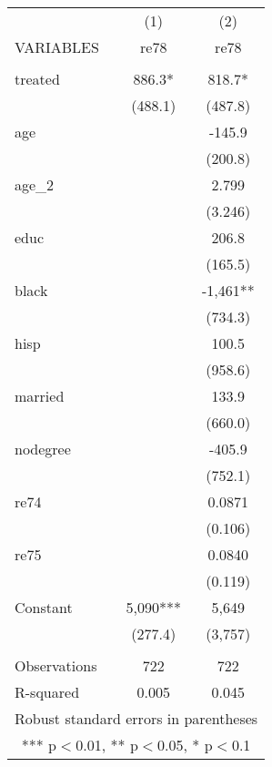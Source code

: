 \begin{tabular}{lcc} \hline
 & (1) & (2) \\
VARIABLES & re78 & re78 \\ \hline
 &  &  \\
treated & 886.3* & 818.7* \\
 & (488.1) & (487.8) \\
age &  & -145.9 \\
 &  & (200.8) \\
age\_2 &  & 2.799 \\
 &  & (3.246) \\
educ &  & 206.8 \\
 &  & (165.5) \\
black &  & -1,461** \\
 &  & (734.3) \\
hisp &  & 100.5 \\
 &  & (958.6) \\
married &  & 133.9 \\
 &  & (660.0) \\
nodegree &  & -405.9 \\
 &  & (752.1) \\
re74 &  & 0.0871 \\
 &  & (0.106) \\
re75 &  & 0.0840 \\
 &  & (0.119) \\
Constant & 5,090*** & 5,649 \\
 & (277.4) & (3,757) \\
 &  &  \\
Observations & 722 & 722 \\
 R-squared & 0.005 & 0.045 \\ \hline
\multicolumn{3}{c}{ Robust standard errors in parentheses} \\
\multicolumn{3}{c}{ *** p$<$0.01, ** p$<$0.05, * p$<$0.1} \\
\end{tabular}
